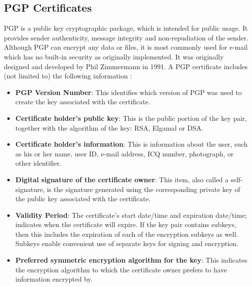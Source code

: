\documentclass{llncs}
\begin{document}
\subsection{PGP Certificates}
PGP is a public key cryptographic package, which is intended for public usage. It provides sender authenticity, message integrity and non-repudiation of the sender. Although PGP can encrypt any data or files, it is most commonly used for e-mail which has no built-in security as originally implemented. It was  originally designed and developed by Phil Zimmermann in 1991.  A PGP certificate includes (not limited to) the following information \cite{pgpworks}:
\begin {itemize}
\item \textbf{PGP Version Number}: This identifies which version of PGP was used to create the key associated with the certificate. 
\item \textbf{Certificate holder's public key}: This is the public portion of the key pair, together with the algorithm of the key: RSA, Elgamal or DSA.   
\item \textbf{Certificate holder's information}: This is information about the user, such as his or her name, user ID, e-mail address, ICQ number, photograph, or other identifier.
\item \textbf{Digital signature of the certificate owner}: This item, also called a self-signature, is the signature generated using the corresponding private key of the public key associated with the certificate. 
\item \textbf{Validity Period}: The certificate's start date/time and expiration date/time; indicates when the certificate will expire. If the key pair contains subkeys, then this includes the expiration of each of the encryption subkeys as well. Subkeys enable convenient use of separate keys for signing and encryption. 
\item \textbf{Preferred symmetric encryption algorithm for the key}: This indicates the encryption algorithm to which the certificate owner prefers to have information encrypted by.
\end{itemize}
\end{document}
